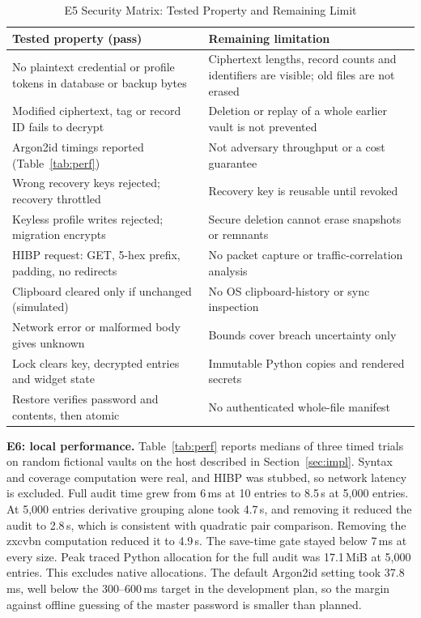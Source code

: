 \documentclass[conference]{IEEEtran}
\begin{document}
\begin{table}[t]
\caption{E5 Security Matrix: Tested Property and Remaining Limit}
\label{tab:sec}
\centering\scriptsize
\begin{tabular}{@{}p{2.9cm}p{5.2cm}@{}}
\toprule
Tested property (pass) & Remaining limitation\\
\midrule
No plaintext credential or profile tokens in database or backup bytes & Ciphertext lengths, record counts and identifiers are visible; old files are not erased\\
Modified ciphertext, tag or record ID fails to decrypt & Deletion or replay of a whole earlier vault is not prevented\\
Argon2id timings reported (Table~\ref{tab:perf}) & Not adversary throughput or a cost guarantee\\
Wrong recovery keys rejected; recovery throttled & Recovery key is reusable until revoked\\
Keyless profile writes rejected; migration encrypts & Secure deletion cannot erase snapshots or remnants\\
HIBP request: GET, 5-hex prefix, padding, no redirects & No packet capture or traffic-correlation analysis\\
Clipboard cleared only if unchanged (simulated) & No OS clipboard-history or sync inspection\\
Network error or malformed body gives unknown & Bounds cover breach uncertainty only\\
Lock clears key, decrypted entries and widget state & Immutable Python copies and rendered secrets\\
Restore verifies password and contents, then atomic & No authenticated whole-file manifest\\
\bottomrule
\end{tabular}
\end{table}

\textbf{E6: local performance.} Table~\ref{tab:perf} reports medians of three timed trials on random fictional vaults on the host described in Section~\ref{sec:impl}. Syntax and coverage computation were real, and HIBP was stubbed, so network latency is excluded. Full audit time grew from 6\,ms at 10 entries to 8.5\,s at 5,000 entries. At 5,000 entries derivative grouping alone took 4.7\,s, and removing it reduced the audit to 2.8\,s, which is consistent with quadratic pair comparison. Removing the zxcvbn computation reduced it to 4.9\,s. The save-time gate stayed below 7\,ms at every size. Peak traced Python allocation for the full audit was 17.1\,MiB at 5,000 entries. This excludes native allocations. The default Argon2id setting took 37.8\,ms, well below the 300--600\,ms target in the development plan, so the margin against offline guessing of the master password is smaller than planned.
\end{document}
